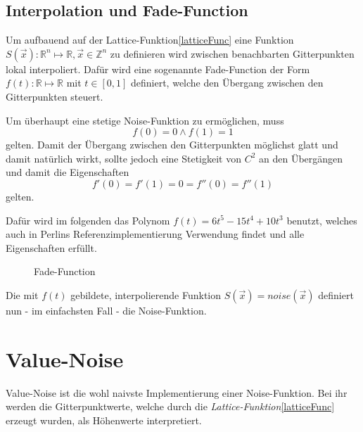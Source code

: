 \subsection{Interpolation und Fade-Function}
Um aufbauend auf der Lattice-Funktion\ref{latticeFunc} eine Funktion $S(\vec{x}): \mathbb{R}^n\mapsto\mathbb{R}, \vec{x}\in \mathbb{Z}^n$\label{S} zu definieren wird zwischen benachbarten Gitterpunkten lokal interpoliert. Dafür wird eine sogenannte Fade-Function\cite{fadeFunction} der Form $f(t): \mathbb{R}\mapsto\mathbb{R}$ mit $t\in[0, 1]$ definiert, welche den Übergang zwischen den Gitterpunkten steuert.

Um überhaupt eine stetige Noise-Funktion zu ermöglichen, muss 
\begin{equation}
f(0) = 0 \land f(1) = 1
\end{equation} gelten.
Damit der Übergang zwischen den Gitterpunkten möglichst glatt und damit natürlich wirkt, sollte jedoch eine Stetigkeit von $C^2$ an den Übergängen und damit die Eigenschaften 
\begin{equation}
	f'(0) = f'(1) = 0 = f''(0) = f''(1)
\end{equation} 
gelten.

Dafür wird im folgenden das Polynom $f(t) = 6t^5-15t^4+10t^3$ benutzt, welches auch in Perlins Referenzimplementierung Verwendung findet\cite{BurgerGradientNoise2008} und alle Eigenschaften erfüllt.
\begin{figure}[!hbtp]%
	\centering
	\caption{Fade-Function}
\end{figure}

Die mit $f(t)$ gebildete, interpolierende Funktion $S(\vec{x}) = noise(\vec{x})$ definiert nun - im einfachsten Fall - die Noise-Funktion.


\section{Value-Noise}\label{Value-Noise}
Value-Noise ist die wohl naivste Implementierung einer Noise-Funktion. Bei ihr werden die Gitterpunktwerte, welche durch die \emph{Lattice-Funktion}\ref{latticeFunc} erzeugt wurden, als Höhenwerte interpretiert.

